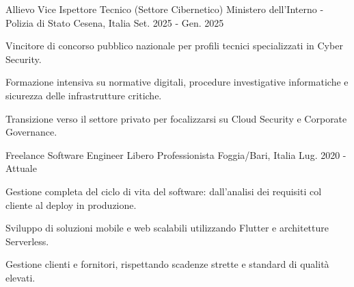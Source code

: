 
\vspace{0.3cm}

\begin{cventries}

  \cventry
    {Allievo Vice Ispettore Tecnico (Settore Cibernetico)}
    {Ministero dell'Interno - Polizia di Stato}
    {Cesena, Italia}
    {Set. 2025 - Gen. 2025}
    {
      \begin{cvitems}
        \item {Vincitore di concorso pubblico nazionale per profili tecnici specializzati in Cyber Security.}
        \item {Formazione intensiva su normative digitali, procedure investigative informatiche e sicurezza delle infrastrutture critiche.}
        \item {Transizione verso il settore privato per focalizzarsi su Cloud Security e Corporate Governance.}
      \end{cvitems}
    }

  \vspace{0.8cm}

  \cventry
    {Freelance Software Engineer}
    {Libero Professionista}
    {Foggia/Bari, Italia}
    {Lug. 2020 - Attuale}
    {
      \begin{cvitems}
        \item {Gestione completa del ciclo di vita del software: dall'analisi dei requisiti col cliente al deploy in produzione.}
        \item {Sviluppo di soluzioni mobile e web scalabili utilizzando Flutter e architetture Serverless.}
        \item {Gestione clienti e fornitori, rispettando scadenze strette e standard di qualità elevati.}
      \end{cvitems}
    }

\end{cventries}
